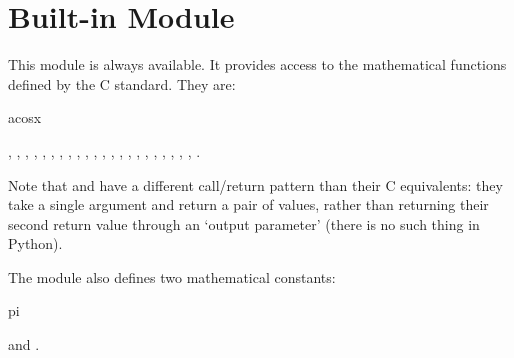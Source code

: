 \section{Built-in Module }
\label{module-math}

\renewcommand{\indexsubitem}{(in module math)}
This module is always available.
It provides access to the mathematical functions defined by the C
standard.
They are:
\iftexi
\begin{funcdesc}{acos}{x}
\end{funcdesc}
\else
{},
,
,
,
,
,
,
,
,
,
,
,
,
,
,
,
,
,
,
,
,
,
.
\fi

Note that  and  have a different call/return
pattern than their C equivalents: they take a single argument and
return a pair of values, rather than returning their second return
value through an `output parameter' (there is no such thing in Python).

The module also defines two mathematical constants:
\iftexi
\begin{datadesc}{pi}
\end{datadesc}
\else
{} and .
\fi

\begin{seealso}
\end{seealso}
